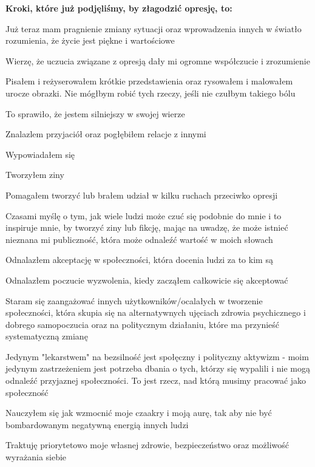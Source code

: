 \noindent\textcolor{ProcessBlue}{\textbf{\LARGE{Kroki, które już podjęliśmy, by złagodzić opresję, to:}}}\\

\begin{multicols}{2}
	\begin{checkboxlist}
		\item Już teraz mam pragnienie zmiany sytuacji oraz wprowadzenia innych w światło rozumienia, że życie jest piękne i wartościowe
		\item Wierzę, że uczucia związane z opresją dały mi ogromne współczucie i zrozumienie
		\item Pisałem i reżyserowałem krótkie przedstawienia oraz rysowałem i malowałem urocze obrazki. Nie mógłbym robić tych rzeczy, jeśli nie czułbym takiego bólu
		\item To sprawiło, że jestem silniejszy w swojej wierze
		\item Znalazlem przyjaciół oraz pogłębiłem relacje z innymi
		\item Wypowiadałem się
		\item Tworzyłem ziny
		\item Pomagałem tworzyć lub brałem udział w kilku ruchach przeciwko opresji
		\item Czasami myślę o tym, jak wiele ludzi może czuć się podobnie do mnie i to inspiruje mnie, by tworzyć ziny lub fikcję, mając na uwadzę, że może istnieć nieznana mi publiczność, która może odnaleźć wartość w moich słowach
		\item Odnalazłem akceptację w społeczności, która docenia ludzi za to kim są
		\item Odnalazłem poczucie wyzwolenia, kiedy zacząłem całkowicie się akceptować
		\item Staram się zaangażować innych użytkowników/ocalałych w tworzenie społeczności, która skupia się na alternatywnych ujęciach zdrowia psychicznego i dobrego samopoczucia oraz na politycznym działaniu, które ma przynieść systematyczną zmianę
		\item Jedynym "lekarstwem" na bezsilność jest społęczny i polityczny aktywizm - moim jedynym zastrzeżeniem jest potrzeba dbania o tych, którzy się wypalili i nie mogą odnaleźć przyjaznej społeczności. To jest rzecz, nad którą musimy pracować jako społeczność
		\item Nauczyłem się jak wzmocnić moje czaakry i moją aurę, tak aby nie być bombardowanym negatywną energią innych ludzi
		\item Traktuję priorytetowo moje własnej zdrowie, bezpieczeństwo oraz możliwość wyrażania siebie

\end{checkboxlist}
\end{multicols}
